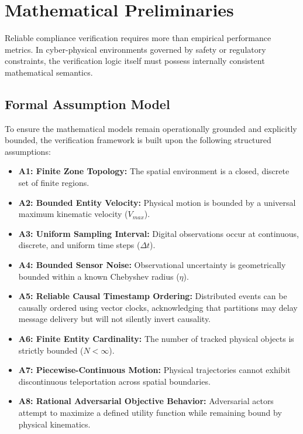 \documentclass[conference]{IEEEtran}
\begin{document}
\section{Mathematical Preliminaries}

Reliable compliance verification requires more than empirical performance metrics. In cyber-physical environments governed by safety or regulatory constraints, the verification logic itself must possess internally consistent mathematical semantics. 

\subsection{Formal Assumption Model}
To ensure the mathematical models remain operationally grounded and explicitly bounded, the verification framework is built upon the following structured assumptions:
\begin{itemize}
    \item \textbf{A1: Finite Zone Topology:} The spatial environment is a closed, discrete set of finite regions.
    \item \textbf{A2: Bounded Entity Velocity:} Physical motion is bounded by a universal maximum kinematic velocity ($V_{max}$).
    \item \textbf{A3: Uniform Sampling Interval:} Digital observations occur at continuous, discrete, and uniform time steps ($\Delta t$).
    \item \textbf{A4: Bounded Sensor Noise:} Observational uncertainty is geometrically bounded within a known Chebyshev radius ($\eta$).
    \item \textbf{A5: Reliable Causal Timestamp Ordering:} Distributed events can be causally ordered using vector clocks, acknowledging that partitions may delay message delivery but will not silently invert causality.
    \item \textbf{A6: Finite Entity Cardinality:} The number of tracked physical objects is strictly bounded ($N < \infty$).
    \item \textbf{A7: Piecewise-Continuous Motion:} Physical trajectories cannot exhibit discontinuous teleportation across spatial boundaries.
    \item \textbf{A8: Rational Adversarial Objective Behavior:} Adversarial actors attempt to maximize a defined utility function while remaining bound by physical kinematics.
\end{itemize}
\end{document}
